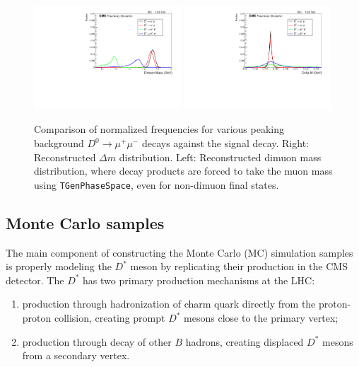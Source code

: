 \begin{figure}[htp]
    \begin{center}
      \includegraphics[width=0.49\textwidth]{figures/chapter4/reconstructed_D0_mass.pdf}
      \includegraphics[width=0.49\textwidth]{figures/chapter4/reconstructed_delta_m.pdf}\\
    \end{center}
    \caption{
      Comparison of normalized frequencies for various peaking background $D^0 \to \mu^+ \mu^-$ decays against the signal decay.
      Right: Reconstructed $\Delta m$ distribution.
      Left: Reconstructed dimuon mass distribution, where decay products are forced to take the muon mass using \texttt{TGenPhaseSpace}, even for non-dimuon final states.
    }
    \label{fig:reconstructed_D0_comparison}
  \end{figure}
  
  


\subsection{Monte Carlo samples}

The main component of constructing the Monte Carlo (MC) simulation samples is properly modeling the $D^*$ meson by replicating their production in the CMS detector. The $D^*$ has two primary production mechanisms at the LHC:
\begin{enumerate}
    \item production through hadronization of charm quark directly from the proton-proton collision, creating prompt $D^*$ mesons close to the primary vertex; 
    \item production through decay of other $B$ hadrons, creating displaced $D^*$ mesons from a secondary vertex.
\end{enumerate}

